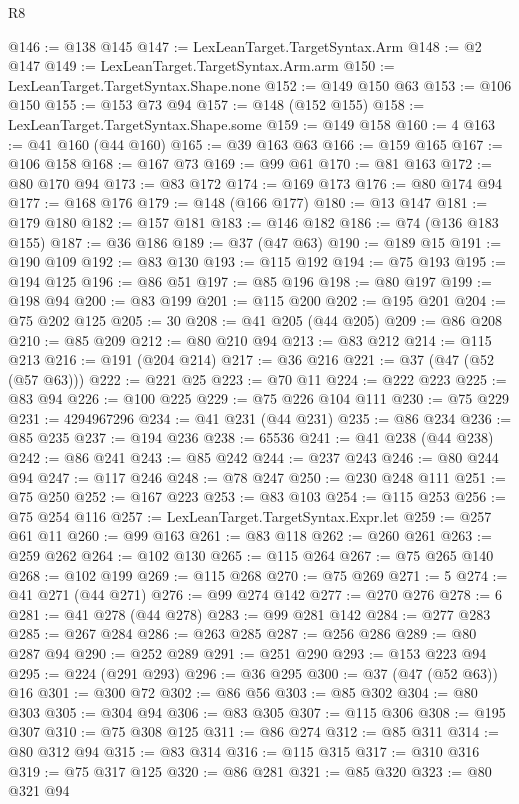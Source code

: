 \begin{lexlean}{R8}
\begin{coremodule}
@146 := @138 @145
@147 := LexLeanTarget.TargetSyntax.Arm
@148 := @2 @147
@149 := LexLeanTarget.TargetSyntax.Arm.arm
@150 := LexLeanTarget.TargetSyntax.Shape.none
@152 := @149 @150 @63
@153 := @106 @150
@155 := @153 @73 @94
@157 := @148 (@152 @155)
@158 := LexLeanTarget.TargetSyntax.Shape.some
@159 := @149 @158
@160 := 4
@163 := @41 @160 (@44 @160)
@165 := @39 @163 @63
@166 := @159 @165
@167 := @106 @158
@168 := @167 @73
@169 := @99 @61
@170 := @81 @163
@172 := @80 @170 @94
@173 := @83 @172
@174 := @169 @173
@176 := @80 @174 @94
@177 := @168 @176
@179 := @148 (@166 @177)
@180 := @13 @147
@181 := @179 @180
@182 := @157 @181
@183 := @146 @182
@186 := @74 (@136 @183 @155)
@187 := @36 @186
@189 := @37 (@47 @63)
@190 := @189 @15
@191 := @190 @109
@192 := @83 @130
@193 := @115 @192
@194 := @75 @193
@195 := @194 @125
@196 := @86 @51
@197 := @85 @196
@198 := @80 @197
@199 := @198 @94
@200 := @83 @199
@201 := @115 @200
@202 := @195 @201
@204 := @75 @202 @125
@205 := 30
@208 := @41 @205 (@44 @205)
@209 := @86 @208
@210 := @85 @209
@212 := @80 @210 @94
@213 := @83 @212
@214 := @115 @213
@216 := @191 (@204 @214)
@217 := @36 @216
@221 := @37 (@47 (@52 (@57 @63)))
@222 := @221 @25
@223 := @70 @11
@224 := @222 @223
@225 := @83 @94
@226 := @100 @225
@229 := @75 @226 @104 @111
@230 := @75 @229
@231 := 4294967296
@234 := @41 @231 (@44 @231)
@235 := @86 @234
@236 := @85 @235
@237 := @194 @236
@238 := 65536
@241 := @41 @238 (@44 @238)
@242 := @86 @241
@243 := @85 @242
@244 := @237 @243
@246 := @80 @244 @94
@247 := @117 @246
@248 := @78 @247
@250 := @230 @248 @111
@251 := @75 @250
@252 := @167 @223
@253 := @83 @103
@254 := @115 @253
@256 := @75 @254 @116
@257 := LexLeanTarget.TargetSyntax.Expr.let
@259 := @257 @61 @11
@260 := @99 @163
@261 := @83 @118
@262 := @260 @261
@263 := @259 @262
@264 := @102 @130
@265 := @115 @264
@267 := @75 @265 @140
@268 := @102 @199
@269 := @115 @268
@270 := @75 @269
@271 := 5
@274 := @41 @271 (@44 @271)
@276 := @99 @274 @142
@277 := @270 @276
@278 := 6
@281 := @41 @278 (@44 @278)
@283 := @99 @281 @142
@284 := @277 @283
@285 := @267 @284
@286 := @263 @285
@287 := @256 @286
@289 := @80 @287 @94
@290 := @252 @289
@291 := @251 @290
@293 := @153 @223 @94
@295 := @224 (@291 @293)
@296 := @36 @295
@300 := @37 (@47 (@52 @63)) @16
@301 := @300 @72
@302 := @86 @56
@303 := @85 @302
@304 := @80 @303
@305 := @304 @94
@306 := @83 @305
@307 := @115 @306
@308 := @195 @307
@310 := @75 @308 @125
@311 := @86 @274
@312 := @85 @311
@314 := @80 @312 @94
@315 := @83 @314
@316 := @115 @315
@317 := @310 @316
@319 := @75 @317 @125
@320 := @86 @281
@321 := @85 @320
@323 := @80 @321 @94

\end{coremodule}
\end{lexlean}
